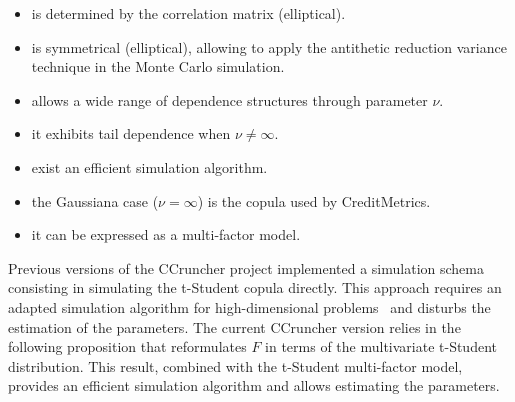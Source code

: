 \documentclass[11pt,fleqn]{book} %
\begin{document}
\begin{itemize}
	\item is determined by the correlation matrix (elliptical). 
	\item is symmetrical (elliptical), allowing to 
	apply the antithetic reduction variance technique in the Monte Carlo 
	simulation.
	\item allows a wide range of dependence structures through parameter $\nu$.
	\item it exhibits tail dependence when $\nu \ne \infty$.
	\item exist an efficient simulation algorithm.
	\item the Gaussiana case ($\nu = \infty$) is the copula used by 
	CreditMetrics\texttrademark.
	\item it can be expressed as a multi-factor model.
\end{itemize}

Previous versions of the CCruncher project implemented a simulation schema
consisting in simulating the t-Student copula directly. This approach 
requires an adapted simulation algorithm for high-dimensional problems~\cite{torrent:2012}
and disturbs the estimation of the parameters. The current CCruncher version 
relies in the following proposition that reformulates $F$ in terms of the 
multivariate t-Student distribution. This result, combined with the t-Student
multi-factor model, provides an efficient simulation algorithm and allows 
estimating the parameters.
\end{document}
